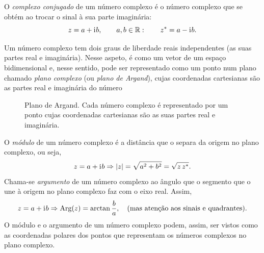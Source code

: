 O \emph{complexo conjugado} de um número complexo é o número complexo que se
obtém ao trocar o sinal à sua parte imaginária:
\begin{equation*}
   z = a+\text{i}\mkern1mu b,\qquad a,b\in\mathbb{R}:\qquad  z^*=a-\text{i}\mkern1mu b.
\end{equation*}

Um número complexo tem dois graus de liberdade reais independentes (as suas
partes real e imaginária). Nesse aspeto, é como um vetor de um espaço
bidimensional e, nesse sentido, pode ser representado como um ponto num plano
chamado \emph{plano complexo} (ou \emph{plano de Argand}), cujas coordenadas
cartesianas são as partes real e imaginária do número
\begin{figure}[htb]
  {\centering
    \par
  }
  \caption{Plano de Argand. Cada número complexo é representado por um ponto
    cujas coordenadas cartesianas são as suas partes real e
  imaginária.\label{fig:argplane}}
\end{figure}
O \emph{módulo} de um número complexo é a distância que o separa da origem no
plano complexo, ou seja,
\begin{equation*}
   z = a+\text{i}\mkern1mu b \Rightarrow | z|= \sqrt{a^2+b^2}=\sqrt{z\,z^*}.
\end{equation*}
Chama-se \emph{argumento} de um número complexo ao ângulo que o segmento que o
une à origem no plano complexo faz com o eixo real. Assim,
\begin{equation*}
   z = a+\text{i}\mkern1mu b \Rightarrow \text{Arg}( z)=\arctan\frac{b}{a},\quad
  \text{(mas atenção aos sinais e quadrantes).}
\end{equation*}
O módulo e o argumento de um número complexo podem, assim, ser vistos como as
coordenadas polares dos pontos que representam os números complexos no plano
complexo.

